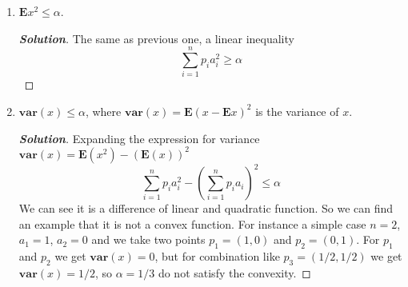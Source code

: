 \documentclass[12pt]{article}
\newenvironment{Solution}
  {\begin{proof}[\textbf{Solution}]}
  {\end{proof}}
\begin{document}
\begin{enumerate}[label=(\alph*)]
	\item
	      \(\mathbf{E}x^2 \leq \alpha\).
	      \begin{Solution}
		      The same as previous one, a linear inequality
		      \[
			      \sum_{i=1}^n p_i a_i^2 \geq \alpha
		      \]
	      \end{Solution}

	\item
	      \(\mathbf{var}(x) \leq \alpha\), where \(\mathbf{var}(x) = \mathbf{E}(x-\mathbf{E}x)^2\) is the variance of \(x\).
	      \begin{Solution}
		      Expanding the expression for variance \(\mathbf{var}(x) = \mathbf{E}(x^2) - (\mathbf{E}(x))^2\)
		      \[
			      \sum_{i=1}^n p_i a_i^2 - (\sum_{i=1}^n p_i a_i)^2 \leq \alpha
		      \]
		      We can see it is a difference of linear and quadratic function. So we can find an example that it is not a convex function. For instance a simple case \(n = 2\), \(a_1 = 1\), \(a_2 = 0\) and we take two points \(p_1 = (1, 0)\) and \(p_2 = (0, 1)\).
		      For \(p_1\) and \(p_2\) we get \(\mathbf{var}(x) = 0\), but for combination like \(p_3 = (1/2, 1/2)\) we get \(\mathbf{var}(x) = 1/2\), so \(\alpha = 1/3\) do not satisfy the convexity.
	      \end{Solution}
\end{enumerate}
\end{document}
